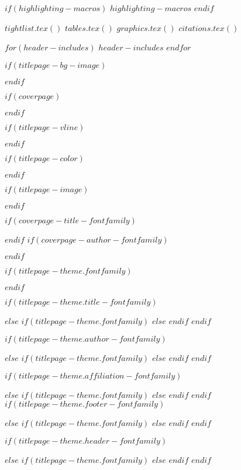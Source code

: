 $if(highlighting-macros)$
$highlighting-macros$
$endif$

$tightlist.tex()$
$tables.tex()$
$graphics.tex()$
$citations.tex()$

$for(header-includes)$
$header-includes$
$endfor$

\usepackage[utf8]{inputenc} %
\usepackage[T1]{fontenc} %
\usepackage{babel}
\usepackage{hyphenat}
\usepackage{ifthen}
\usepackage{calc}
\usepackage{calculator}

$if(titlepage-bg-image)$
\usepackage{graphicx}
\usepackage{wallpaper} %
\usepackage{geometry}
$endif$

$if(coverpage)$
\usepackage{graphicx}
\usepackage{geometry}
\usepackage{afterpage}
\usepackage{tikz}
\usetikzlibrary{calc}
\usetikzlibrary{fadings}
\usepackage[pagecolor=none]{pagecolor}
$endif$

$if(titlepage-vline)$
\usepackage{graphicx}
\usepackage{tikz}
\usetikzlibrary{calc}
$endif$

$if(titlepage-color)$
\usepackage[pagecolor=none]{pagecolor}
$endif$

$if(titlepage-image)$
\usepackage{wallpaper} %
$endif$

$if(coverpage-title-fontfamily)$
\usepackage{fontspec}
$endif$
$if(coverpage-author-fontfamily)$
\usepackage{fontspec}
$endif$

$if(titlepage-theme.fontfamily)$
\usepackage{fontspec}
$endif$

$if(titlepage-theme.title-fontfamily)$
\usepackage{fontspec}
$else$
$if(titlepage-theme.fontfamily)$
\newcommand{\titlepagetitlefont}{\titlepagefont}
$else$
\newcommand{\titlepagetitlefont}{}
$endif$
$endif$

$if(titlepage-theme.author-fontfamily)$
\usepackage{fontspec}
$else$
$if(titlepage-theme.fontfamily)$
\newcommand{\titlepageauthorfont}{\titlepagefont}
$else$
\newcommand{\titlepageauthorfont}{}
$endif$
$endif$

$if(titlepage-theme.affiliation-fontfamily)$
\usepackage{fontspec}
$else$
$if(titlepage-theme.fontfamily)$
\newcommand{\titlepageaffiliationfont}{\titlepagefont}
$else$
\newcommand{\titlepageaffiliationfont}{}
$endif$
$endif$
$if(titlepage-theme.footer-fontfamily)$
\usepackage{fontspec}
$else$
$if(titlepage-theme.fontfamily)$
\newcommand{\titlepagefooterfont}{\titlepagefont}
$else$
\newcommand{\titlepagefooterfont}{}
$endif$
$endif$

$if(titlepage-theme.header-fontfamily)$
\usepackage{fontspec}
$else$
$if(titlepage-theme.fontfamily)$
\newcommand{\titlepageheaderfont}{\titlepagefont}
$else$
\newcommand{\titlepageheaderfont}{}
$endif$
$endif$

